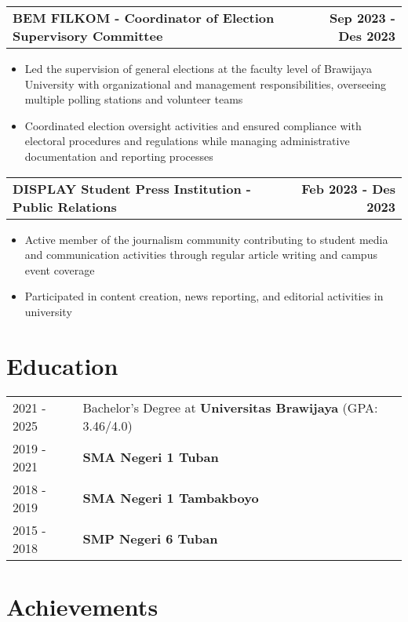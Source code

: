 \documentclass[a4paper,12pt]{article}
\makeatletter
\newenvironment{joblong}[2]
    {
    \begin{tabularx}{\linewidth}{@{}l X r@{}}
    \textbf{#1} & \hfill &  #2 \\[3.75pt]
    \end{tabularx}
    \begin{minipage}[t]{\linewidth}
    \begin{itemize}[nosep,after=\strut, leftmargin=1em, itemsep=3pt,label=--]
    }
    {
    \end{itemize}
    \end{minipage}    
    }
\makeatother
\begin{document}
\begin{joblong}{BEM FILKOM - Coordinator of Election Supervisory Committee}{\textbf{Sep 2023 - Des 2023}}
\item Led the supervision of general elections at the faculty level of Brawijaya University with organizational and management responsibilities, overseeing multiple polling stations and volunteer teams
\item Coordinated election oversight activities and ensured compliance with electoral procedures and regulations while managing administrative documentation and reporting processes
\end{joblong}

\begin{joblong}{DISPLAY Student Press Institution - Public Relations}{\textbf{Feb 2023 - Des 2023}}
\item Active member of the journalism community contributing to student media and communication activities through regular article writing and campus event coverage
\item Participated in content creation, news reporting, and editorial activities in university
\end{joblong}


\section{Education}
\begin{tabularx}{\linewidth}{@{}l X@{}}
2021 - 2025 & Bachelor's Degree at \textbf{Universitas Brawijaya} \hfill (GPA: 3.46/4.0) \\ 
2019 - 2021 & \textbf{SMA Negeri 1 Tuban} \\
2018 - 2019 & \textbf{SMA Negeri 1 Tambakboyo} \\
2015 - 2018 & \textbf{SMP Negeri 6 Tuban} \\
\end{tabularx}

\section{Achievements}
\hypersetup{hidelinks}
\end{document}
